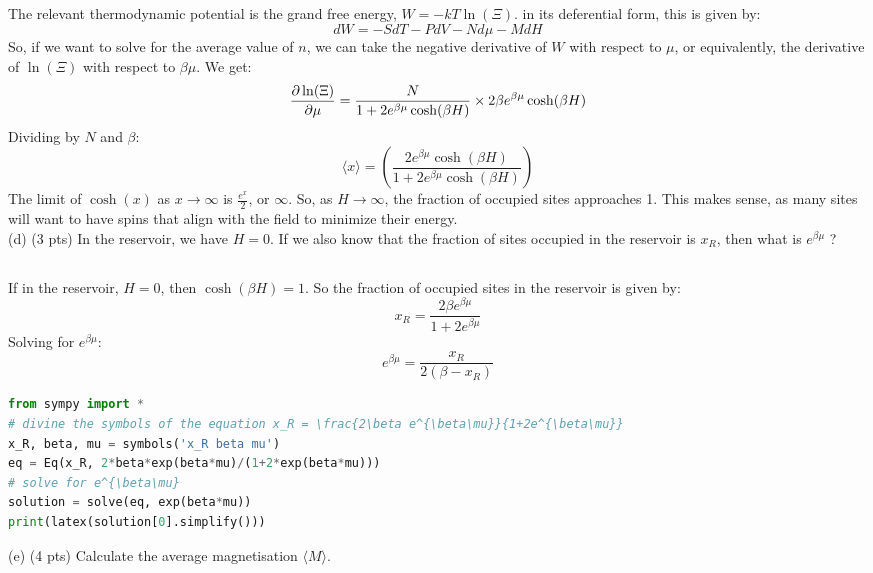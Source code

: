 \documentclass[12pt]{article}
\begin{document}
\subsection{}
The relevant thermodynamic potential is the grand free energy, $W = -kT \ln(\Xi)$. in its deferential form, this is given by:
\begin{equation}
  dW = -S dT - P dV - N d\mu - M dH
\end{equation}
So, if we want to solve for the average value of $n$, we can take the negative derivative of $W$ with respect to $\mu$, or equivalently, the derivative of $\ln(\Xi)$ with respect to $\beta\mu$. We get:
\begin{equation}
  \pdv{\ln(\Xi)}{\mu} = \frac{N}{1+2e^{\beta\mu}\cosh(\beta H)} \times 2\beta e^{\beta\mu}\cosh(\beta H)
\end{equation}
Dividing by $N$ and $\beta$:
\begin{equation}
  \langle x \rangle = \left( \frac{2e^{\beta\mu}\cosh(\beta H)}{1+2e^{\beta\mu}\cosh(\beta H)} \right)
\end{equation}
The limit of $\cosh(x)$ as $x \rightarrow \infty$ is $\frac{e^x}{2}$, or $\infty$. So, as $H \rightarrow \infty$, the fraction of occupied sites approaches 1. This makes sense, as many sites will want to have spins that align with the field to minimize their energy.\\
(d) (3 pts) In the reservoir, we have $H=0$. If we also know that the fraction of sites occupied in the reservoir is $x_{R}$, then what is $e^{\beta \mu}$ ?
\subsection{}
If in the reservoir, $H=0$, then $\cosh(\beta H) = 1$. So the fraction of occupied sites in the reservoir is given by:
\begin{equation}
  x_R = \frac{2\beta e^{\beta\mu}}{1+2e^{\beta\mu}}
\end{equation}
Solving for $e^{\beta\mu}$:
\begin{equation}
  e^{\beta\mu} = \frac{x_{R}}{2 \left(\beta - x_{R}\right)}
\end{equation}
\begin{lstlisting}[language=Python]
from sympy import *
# divine the symbols of the equation x_R = \frac{2\beta e^{\beta\mu}}{1+2e^{\beta\mu}}
x_R, beta, mu = symbols('x_R beta mu')
eq = Eq(x_R, 2*beta*exp(beta*mu)/(1+2*exp(beta*mu)))
# solve for e^{\beta\mu}
solution = solve(eq, exp(beta*mu))
print(latex(solution[0].simplify()))
\end{lstlisting}
(e) (4 pts) Calculate the average magnetisation $\langle M\rangle$.
\end{document}
